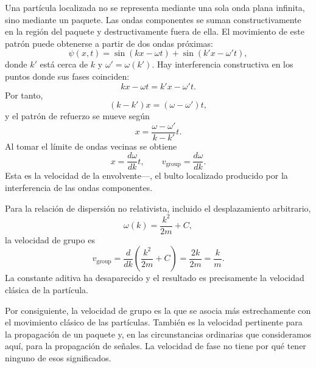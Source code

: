 Una partícula localizada no se representa mediante una sola onda plana infinita, sino mediante un paquete. Las ondas componentes se suman constructivamente en la región del paquete y destructivamente fuera de ella. El movimiento de este patrón puede obtenerse a partir de dos ondas próximas:
\begin{equation}
\psi(x,t)=
\sin(kx-\omega t)+
\sin(k'x-\omega't),
\end{equation}
donde \(k'\) está cerca de \(k\) y \(\omega'=\omega(k')\). Hay interferencia constructiva en los puntos donde sus fases coinciden:
\begin{equation}
kx-\omega t=k'x-\omega't.
\end{equation}
Por tanto,
\begin{equation}
(k-k')x=(\omega-\omega')t,
\end{equation}
y el patrón de refuerzo se mueve según
\begin{equation}
x=\frac{\omega-\omega'}{k-k'}t.
\end{equation}
Al tomar el límite de ondas vecinas se obtiene
\begin{equation}
x=\frac{d\omega}{dk}t,
\qquad
v_{\mathrm{group}}=\frac{d\omega}{dk}.
\end{equation}
Esta es la velocidad de la envolvente---, el bulto localizado producido por la interferencia de las ondas componentes.

Para la relación de dispersión no relativista, incluido el desplazamiento arbitrario,
\begin{equation}
\omega(k)=\frac{k^2}{2m}+C,
\end{equation}
la velocidad de grupo es
\begin{equation}
v_{\mathrm{group}}
=\frac{d}{dk}\left(\frac{k^2}{2m}+C\right)
=\frac{2k}{2m}
=\frac{k}{m}.
\end{equation}
La constante aditiva ha desaparecido y el resultado es precisamente la velocidad clásica de la partícula.

\begin{classroomqa}\end{classroomqa}

Por consiguiente, la velocidad de grupo es la que se asocia más estrechamente con el movimiento clásico de las partículas. También es la velocidad pertinente para la propagación de un paquete y, en las circunstancias ordinarias que consideramos aquí, para la propagación de señales. La velocidad de fase no tiene por qué tener ninguno de esos significados.

